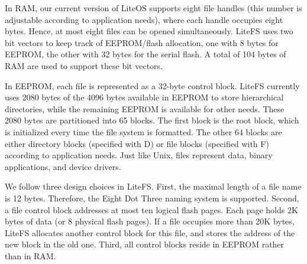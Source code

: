 In RAM, our current version of LiteOS supports eight
file handles (this number is adjustable according to application needs), where each handle occupies eight bytes. Hence,
at most eight files can be opened simultaneously. LiteFS
uses two bit vectors to keep track of EEPROM/flash allocation, one with 8 bytes for EEPROM, the other with 32 bytes
for the serial flash. A total of 104 bytes of RAM are used to
support these bit vectors.

In EEPROM, each file is represented as a 32-byte control block. LiteFS currently uses 2080 bytes of the 4096
bytes available in EEPROM to store hierarchical directories, while the remaining EEPROM is available for other
needs. These 2080 bytes are partitioned into 65 blocks. The
first block is the root block, which is initialized every time
the file system is formatted. The other 64 blocks are either
directory blocks (specified with D) or file blocks (specified
with F) according to application needs. Just like Unix, files
represent data, binary applications, and device drivers.

We follow three design choices in LiteFS. First, the maximal length of a file name is 12 bytes. Therefore, the Eight
Dot Three naming system is supported. Second, a file control block addresses at most ten logical flash pages. Each
page holds 2K bytes of data (or 8 physical flash pages). If a
file occupies more than 20K bytes, LiteFS allocates another
control block for this file, and stores the address of the new
block in the old one. Third, all control blocks reside in EEPROM rather than in RAM.